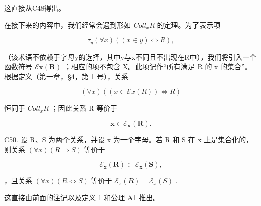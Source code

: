 这直接从C48得出。

在接下来的内容中，我们经常会遇到形如 \(Coll_{x}R\) 的定理。为了表示项

\[
\tau_ {y} (\forall x) ((x \in y) \iff R),
\]

（该术语不依赖于字母y的选择，其中y与x不同且不出现在R中），我们将引入一个函数符号 \(\mathcal{E}\mathbf{x}(\mathbf{R})\) ；相应的项不包含 X。此项记作“所有满足 R 的 x 的集合”。根据定义（第一章，§4，第 1 号），关系

\[
(\forall x) ((x \in \mathcal {E} x (R)) \iff R)
\]

恒同于 \(Coll_{x}R\) ；因此关系 R 等价于

\[
\boldsymbol {x} \in \mathcal {E} _ {\boldsymbol {x}} (\boldsymbol {R}).
\]

C50. 设 R、S 为两个关系，并设 x 为一个字母。若 R 和 S 在 x 上是集合化的，则关系 \((\forall x)(R \Longrightarrow S)\) 等价于

\[
\mathcal {E} _ {\boldsymbol {x}} (\boldsymbol {R}) \subset \mathcal {E} _ {\boldsymbol {x}} (\boldsymbol {S}),
\]

，且关系 \((\forall x)(R \Longleftrightarrow S)\) 等价于 \(\mathcal{E}_{x}(R) = \mathcal{E}_{x}(S)\) .

这直接由前面的注记以及定义 1 和公理 A1 推出。

